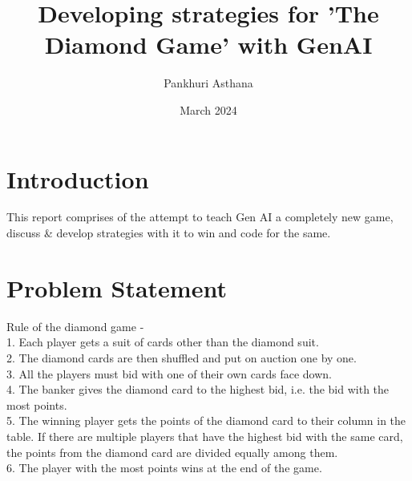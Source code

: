 \documentclass{article}
\title{Developing strategies for 'The Diamond Game' with GenAI}
\author{Pankhuri Asthana}
\date{March 2024}
\begin{document}
\maketitle

\section{Introduction}

This report comprises of the attempt to teach Gen AI a completely new game, discuss \& develop strategies with it to win and code for the same. 

\section{Problem Statement}
Rule of the diamond game -\\
1. Each player gets a suit of cards other than the diamond suit. \\
2. The diamond cards are then shuffled and put on auction one by one. \\
3. All the players must bid with one of their own cards face down. \\
4. The banker gives the diamond card to the highest bid, i.e. the bid with the most points. \\
5. The winning player gets the points of the diamond card to their column in the table. If there are multiple players that have the highest bid with the same card, the points from the diamond card are divided equally among them. \\
6. The player with the most points wins at the end of the game.
\end{document}
